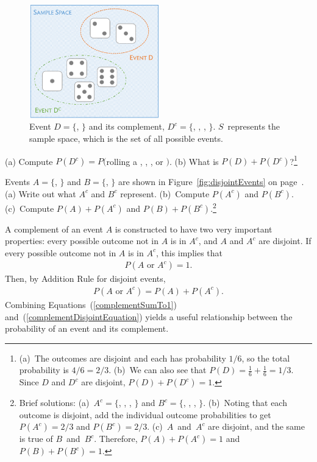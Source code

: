 \begin{figure}[hht]
\centering
\includegraphics[width=0.50\textwidth]{ch_probability_oi_biostat/figures/complementOfD/complementOfD}
\caption{Event $D=\{$, $\}$ and its complement, $D^c = \{$, , , $\}$. $S$~represents the sample space, which is the set of all possible events.}
\label{fig:complementOfD}
\end{figure}

\begin{exercise}
(a) Compute $P(D^c) = P($rolling a , , , or $)$. (b) What is $P(D) + P(D^c)$?\footnote{(a)~The outcomes are disjoint and each has probability $1/6$, so the total probability is $4/6=2/3$. (b)~We can also see that $P(D)=\frac{1}{6} + \frac{1}{6} = 1/3$. Since $D$ and $D^c$ are disjoint, $P(D) + P(D^c) = 1$.}
\end{exercise}

\begin{exercise}
Events $A=\{$, $\}$ and $B=\{$, $\}$ are shown in Figure~\ref{fig:disjointEvents} on page~\pageref{fig:disjointEvents}. (a) Write out what $A^c$ and $B^c$ represent. (b)~Compute $P(A^c)$ and $P(B^c)$. (c)~Compute $P(A)+P(A^c)$ and $P(B)+P(B^c)$.\footnote{Brief solutions: (a)~$A^c=\{$, , , $\}$ and $B^c=\{$, , , $\}$. (b)~Noting that each outcome is disjoint, add the individual outcome probabilities to get $P(A^c)=2/3$ and $P(B^c)=2/3$. (c)~$A$~and~$A^c$ are disjoint, and the same is true of $B$~and~$B^c$. Therefore, $P(A) + P(A^c) = 1$ and $P(B) + P(B^c) = 1$.}
\end{exercise}

A complement of an event $A$ is constructed to have two very important properties: every possible outcome not in $A$ is in $A^c$, and $A$ and $A^c$ are disjoint. If every possible outcome not in $A$ is in $A^c$, this implies that
\begin{eqnarray}
P(A\text{ or }A^c) = 1.
\label{complementSumTo1}
\end{eqnarray}
Then, by Addition Rule for disjoint events,
\begin{eqnarray}
P(A\text{ or }A^c) = P(A) + P(A^c).
\label{complementDisjointEquation}
\end{eqnarray}
Combining Equations~(\ref{complementSumTo1}) and~(\ref{complementDisjointEquation}) yields a useful relationship between the probability of an event and its complement.


